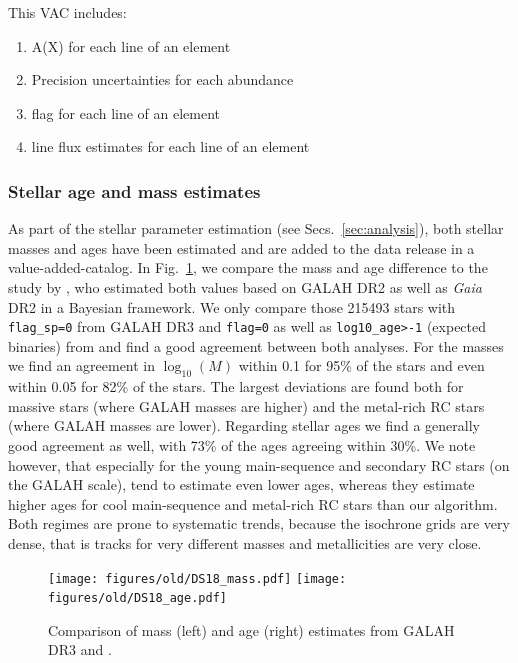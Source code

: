 \documentclass[fleqn,usenatbib,useAMS]{mnras}
\newcommand{\Gaia}{\textit{Gaia}\xspace}
\begin{document}
This VAC includes:
\begin{enumerate}
\item A(X) for each line of an element
\item Precision uncertainties for each abundance
\item flag for each line of an element
\item line flux estimates for each line of an element
\end{enumerate}

\subsubsection{Stellar age and mass estimates} \label{sec:vac_age}

As part of the stellar parameter estimation (see Secs.~\ref{sec:analysis}), both stellar masses and ages have been estimated and are added to the data release in a value-added-catalog. In Fig.~\ref{fig:mass_age_sanders}, we compare the mass and age difference to the study by \citet{Sanders2018}, who estimated both values based on GALAH DR2   as well as \Gaia DR2 in a Bayesian framework. We only compare those 215493 stars with \texttt{flag\_sp=0} from GALAH DR3 and  \texttt{flag=0} as well as \texttt{log10\_age>-1} (expected binaries) from \citet{Sanders2018} and find a good agreement between both analyses. For the masses we find an agreement in $\log_{10} (M)$ within 0.1 for 95\% of the stars and even within 0.05 for 82\% of the stars. The largest deviations are found both for massive stars (where GALAH masses are higher) and the metal-rich RC stars (where GALAH masses are lower). Regarding stellar ages we find a generally good agreement as well, with 73\% of the ages agreeing within 30\%. We note however, that especially for the young main-sequence and secondary RC stars  (on the GALAH scale), \citet{Sanders2018} tend to estimate even lower ages, whereas they estimate higher ages for cool main-sequence and metal-rich RC stars than our algorithm. Both regimes are prone to systematic trends, because the isochrone grids are very dense, that is tracks for very different masses and metallicities are very close.

\begin{figure}
\centering
\texttt{[image: figures/old/DS18\_mass.pdf]}
\texttt{[image: figures/old/DS18\_age.pdf]}
  \caption[{Comparison of mass (left) and age (right) estimates from GALAH DR3 and \citet{Sanders2018}.}]{Comparison of mass (left) and age (right) estimates from GALAH DR3 and \citet{Sanders2018}.}
  \label{fig:mass_age_sanders}
\end{figure}
\end{document}
